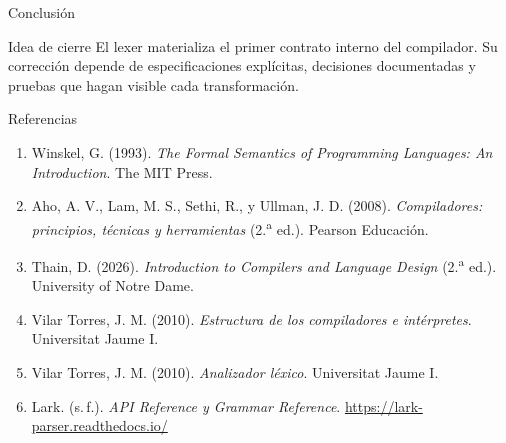 \documentclass[11pt,spanish]{beamer}
\begin{document}
\begin{frame}{Conclusión}
\vfill

\begin{center}
\end{center}

\bigskip

\begin{block}{Idea de cierre}
El lexer materializa el primer contrato interno del compilador. Su corrección depende de especificaciones explícitas, decisiones documentadas y pruebas que hagan visible cada transformación.
\end{block}

\vfill
\end{frame}

\begin{frame}{Referencias}
\vfill
\tiny
\begin{enumerate}
  \item Winskel, G. (1993). \textit{The Formal Semantics of Programming Languages: An Introduction}. The MIT Press.
  \item Aho, A. V., Lam, M. S., Sethi, R., y Ullman, J. D. (2008). \textit{Compiladores: principios, técnicas y herramientas} (2.\textsuperscript{a} ed.). Pearson Educación.
  \item Thain, D. (2026). \textit{Introduction to Compilers and Language Design} (2.\textsuperscript{a} ed.). University of Notre Dame.
  \item Vilar Torres, J. M. (2010). \textit{Estructura de los compiladores e intérpretes}. Universitat Jaume I.
  \item Vilar Torres, J. M. (2010). \textit{Analizador léxico}. Universitat Jaume I.
  \item Lark. (s.\,f.). \textit{API Reference y Grammar Reference}. \url{https://lark-parser.readthedocs.io/}
\end{enumerate}
\vfill
\end{frame}
\end{document}
